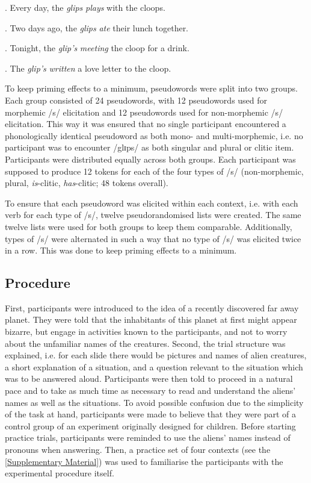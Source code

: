 \ex.
\label{ex:4.1}
Every day, the \textit{glips} \textit{plays} with the cloops.

\ex.
\label{ex:4.2}
Two days ago, the \textit{glips} \textit{ate} their lunch together.

\ex.
\label{ex:4.3}
Tonight, the \textit{glip's} \textit{meeting} the cloop for a drink.

\ex.
\label{ex:4.4}
The \textit{glip's} \textit{written} a love letter to the cloop.

To keep priming effects to a minimum, pseudowords were split into two groups. Each group consisted of 24 pseudowords, with 12 pseudowords used for morphemic /s/ elicitation and 12 pseudowords used for non-morphemic /s/ elicitation. This way it was ensured that no single participant encountered a phonologically identical pseudoword as both mono- and multi-morphemic, i.e. no participant was to encounter /glɪps/ as both singular and plural or clitic item. Participants were distributed equally across both groups. Each participant was supposed to produce 12 tokens for each of the four types of /s/ (non-morphemic, plural, \textit{is}-clitic, \textit{has}-clitic; 48 tokens overall).

To ensure that each pseudoword was elicited within each context, i.e. with each verb for each type of /s/, twelve pseudorandomised lists were created. The same twelve lists were used for both groups to keep them comparable. Additionally, types of /s/ were alternated in such a way that no type of /s/ was elicited twice in a row. This was done to keep priming effects to a minimum.

\subsection{Procedure}\label{section04_1_3}

First, participants were introduced to the idea of a recently discovered far away planet. They were told that the inhabitants of this planet at first might appear bizarre, but engage in activities known to the participants, and not to worry about the unfamiliar names of the creatures. Second, the trial structure was explained, i.e. for each slide there would be pictures and names of alien creatures, a short explanation of a situation, and a question relevant to the situation which was to be answered aloud. Participants were then told to proceed in a natural pace and to take as much time as necessary to read and understand the aliens’ names as well as the situations. To avoid possible confusion due to the simplicity of the task at hand, participants were made to believe that they were part of a control group of an experiment originally designed for children. Before starting practice trials, participants were reminded to use the aliens’ names instead of pronouns when answering. Then, a practice set of four contexts (see the \ref{Supplementary Material}) was used to familiarise the participants with the experimental procedure itself.

